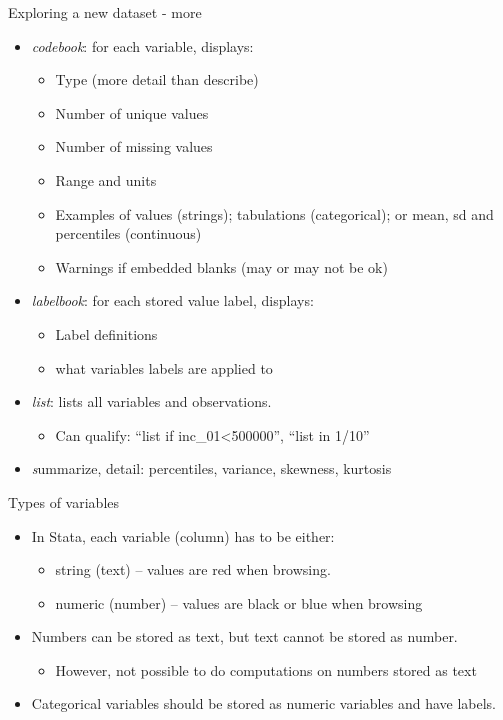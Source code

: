\documentclass[aspectratio=169]{beamer}
\begin{document}
\begin{frame}{Exploring a new dataset - more}
\begin{itemize}
\item \textit{codebook}: for each variable, displays:
	\begin{itemize}
		\item Type (more detail than describe)
		\item Number of unique values
		\item Number of missing values
		\item Range and units
		\item Examples of values (strings); tabulations (categorical); or mean, sd and percentiles (continuous)
		\item Warnings if embedded blanks (may or may not be ok)
	\end{itemize}
\item \textit {labelbook}: for each stored value label, displays:
	\begin{itemize}
		\item Label definitions
		\item what variables labels are applied to
	\end{itemize}
\item \textit {list}: lists all variables and observations. 
	\begin{itemize}
		\item Can qualify: “list if inc\_01<500000”, “list in 1/10”
	\end{itemize}
\item \textit summarize, detail: percentiles, variance, skewness, kurtosis
\end{itemize}
\end{frame}

\begin{frame}{Types of variables}
\begin{itemize}
	\item In Stata, each variable (column) has to be either:
	\begin{itemize}
		\item string (text) – values are red when browsing.
		\item numeric (number) – values are black or blue when browsing
	\end{itemize}
	\item Numbers can be stored as text, but text cannot be stored as number. 
	\begin{itemize}
		\item 	However, not possible to do computations on numbers stored as text 
	\end{itemize}
	\item Categorical variables should be stored as numeric variables and have labels.
\end{itemize}
\end{frame}
\end{document}
